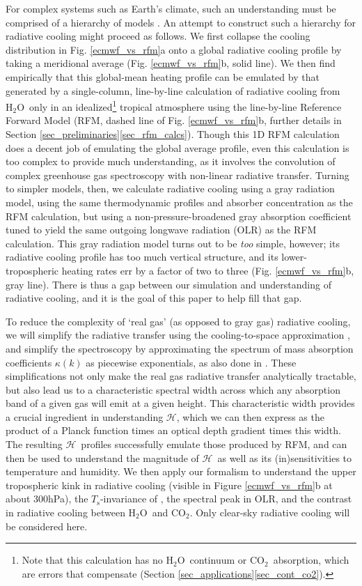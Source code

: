 \documentclass{ametsoc}
\newcommand{\Ts}{\ensuremath{T_\mathrm{s}}}
\newcommand{\cotwo}{\ensuremath{\mathrm{CO_2}}}
\newcommand{\htwo}{\ensuremath{\mathrm{H_2O}}}
\newcommand{\ch}{\ensuremath{\mathcal{H}}}
\begin{document}
For complex systems such as Earth's climate, such an understanding must be comprised of a hierarchy of models \citep{jeevanjee2017a,held2005}. An attempt to construct such a hierarchy for radiative cooling might proceed as follows. We first collapse the cooling distribution in Fig. \ref{ecmwf_vs_rfm}a onto a global radiative cooling profile by taking a meridional average (Fig. \ref{ecmwf_vs_rfm}b, solid line). We then find empirically that this global-mean heating profile can be emulated by that generated by a single-column, line-by-line calculation of radiative cooling from \htwo\ only in an idealized\footnote{Note that this calculation has no \htwo\ continuum or \cotwo\ absorption, which are errors that compensate (Section \ref{sec_applications}\ref{sec_cont_co2}).} tropical atmosphere using the line-by-line Reference Forward Model (RFM, dashed line of Fig. \ref{ecmwf_vs_rfm}b,  further details in Section \ref{sec_preliminaries}\ref{sec_rfm_calcs}).  Though this 1D RFM calculation does a decent job of emulating the global average profile,  even this calculation is too complex to provide much understanding, as it involves the convolution of complex greenhouse gas spectroscopy with non-linear radiative transfer. Turning to simpler models, then, we calculate radiative cooling using a gray radiation model, using the same thermodynamic profiles and absorber concentration as the RFM calculation, but using a non-pressure-broadened gray absorption coefficient tuned to yield the same outgoing longwave radiation (OLR) as the RFM calculation. This gray radiation model turns out to be \emph{too} simple, however;  its radiative cooling profile has too much vertical structure, and its lower-tropospheric heating rates err by a factor of two to three (Fig. \ref{ecmwf_vs_rfm}b, gray line). There is thus a gap between our simulation and understanding of radiative cooling, and it is the goal of this paper to help fill that gap.

To reduce the complexity of `real gas' (as opposed to gray gas) radiative cooling, we will simplify the radiative transfer using  the cooling-to-space approximation \citep[e.g.][]{petty2006}, and simplify the spectroscopy by approximating the spectrum of mass absorption coefficients $\kappa(k)$ as piecewise exponentials, 
as also done in \cite{wilson2012}. These simplifications not only make the real gas radiative transfer analytically tractable, but also lead us to a characteristic spectral width across which any absorption band of a given gas will emit at a given height. This characteristic width provides a crucial  ingredient in understanding \ch, which we can then express  as the product of a Planck function times an optical depth gradient times this width. The resulting \ch\ profiles successfully emulate those produced by RFM, and can then be used to understand the magnitude of \ch\ as well as its  (in)sensitivities to temperature and humidity. We then apply our formalism  to understand the upper tropospheric kink in radiative cooling (visible in Figure \ref{ecmwf_vs_rfm}b at about 300hPa), the \Ts-invariance of \cite{jeevanjee2018},  the spectral peak in OLR, and the contrast in radiative cooling between \htwo\ and \cotwo. Only clear-sky radiative cooling will be considered here.
\end{document}
